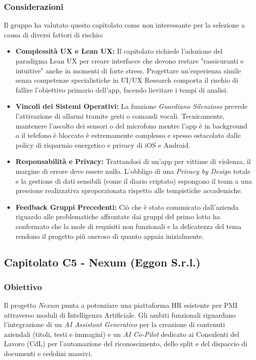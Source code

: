 \documentclass[a4paper, 10pt, colorlinks=true, linkcolor=black, urlcolor=blue, citecolor=blue, hidelinks]{article}
\begin{document}
\subsubsection{Considerazioni}
Il gruppo ha valutato questo capitolato come non interessante per la selezione a causa di diversi fattori di rischio:
\begin{itemize}
    \item \textbf{Complessità UX e Lean UX:} Il capitolato richiede l'adozione del paradigma Lean UX per creare interfacce che devono restare "rassicuranti e intuitive" anche in momenti di forte stress. Progettare un'esperienza simile senza competenze specialistiche in UI/UX Research comporta il rischio di fallire l'obiettivo primario dell'app, facendo lievitare i tempi di analisi.
    \item \textbf{Vincoli dei Sistemi Operativi:} La funzione \textit{Guardiano Silenzioso} prevede l'attivazione di allarmi tramite gesti o comandi vocali. Tecnicamente, mantenere l'ascolto dei sensori o del microfono mentre l'app è in background o il telefono è bloccato è estremamente complesso e spesso ostacolato dalle policy di risparmio energetico e privacy di iOS e Android.
    \item \textbf{Responsabilità e Privacy:} Trattandosi di un'app per vittime di violenza, il margine di errore deve essere nullo. L'obbligo di una \textit{Privacy by Design} totale e la gestione di dati sensibili (come il diario criptato) espongono il team a una pressione realizzativa sproporzionata rispetto alle tempistiche accademiche.
    \item \textbf{Feedback Gruppi Precedenti:} Ciò che è stato comunicato dall'azienda riguardo alle problematiche affrontate dai gruppi del primo lotto ha confermato che la mole di requisiti non funzionali e la delicatezza del tema rendono il progetto più oneroso di quanto appaia inizialmente.
\end{itemize}

\subsection{Capitolato C5 - Nexum (Eggon S.r.l.)}

\subsubsection{Obiettivo}
Il progetto \textit{Nexum} punta a potenziare una piattaforma HR esistente per PMI attraverso moduli di Intelligenza Artificiale. Gli ambiti funzionali riguardano l'integrazione di un \textit{AI Assistant Generativo} per la creazione di contenuti aziendali (titoli, testi e immagini) e un \textit{AI Co-Pilot} dedicato ai Consulenti del Lavoro (CdL) per l'automazione del riconoscimento, dello split e del dispaccio di documenti e cedolini massivi.
\end{document}
